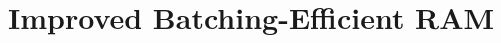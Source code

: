 \documentclass[sigconf]{acmart}
\newcommand{\op}{{op}} %
\newcommand{\setH}{\mathbb{K}}
\newcommand{\F}{\mathbb{F}}
\newcommand{\wt}[1]{\widetilde{#1}}
\newcommand{\tr}{\ensuremath{\mathsf{tr}}}
\newcommand{\evalH}[1]{\ensuremath{{#1}_{|_\setH}}} %
\newcommand{\Lperm}{\ensuremath{\mathcal{L}_{\mathsf{perm}}}}
\providecommand{\DIFaddend}{} %
\DeclareRobustCommand{\DIFaddend}{\DIFOaddend \let\includegraphics\DIFOincludegraphics} %
\begin{document}

	\DIFaddend 
%	
%	
%	
%	
%	
%	
%	
%	
%	
%	
%	
	\section{Improved Batching-Efficient RAM}\label{sec:batch-efficient-ram}
	
\end{document}
